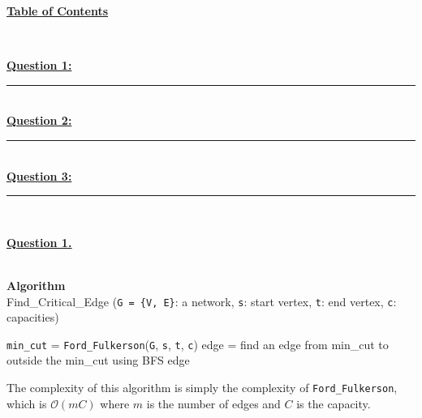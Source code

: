 \documentclass[12pt]{article}
\begin{document}
\begin{center}
	\hypertarget{toc}{\LARGE \underline{\textbf{Table of Contents}}}\\
\end{center}

\hyperlink{1}{\textbf{Question 1:}}
\vspace{1mm}
\hrule
\vspace{1mm} \leavevmode \\

\hyperlink{2}{\textbf{Question 2:}}
\vspace{1mm}
\hrule
\vspace{1mm} \leavevmode \\

\hyperlink{3}{\textbf{Question 3:}}
\vspace{1mm}
\hrule
\vspace{1mm} \leavevmode \\

\newpage

\hyperlink{toc}{\hypertarget{1}{\LARGE \underline{\textbf{Question 1.}}}}\\\\
\begin{algorithm}
  \caption*{\textbf{Algorithm}\\Find\_Critical\_Edge \big(\texttt{G = \{V, E\}}: a network, \texttt{s}: start vertex, \texttt{t}: end vertex, \texttt{c}: capacities\big)}\label{alg:cap}
	\begin{algorithmic}[1]
    \State \texttt{min\_cut} = \texttt{Ford\_Fulkerson}(\texttt{G}, \texttt{s}, \texttt{t}, \texttt{c})
    \State edge = find an edge from min\_cut to outside the min\_cut using BFS
    \State\Return edge
	\end{algorithmic}
\end{algorithm}

The complexity of this algorithm is simply the complexity of \texttt{Ford\_Fulkerson},
which is $\mathcal{O}(mC)$ where $m$ is the number of edges and $C$ is the capacity.\\
\end{document}

